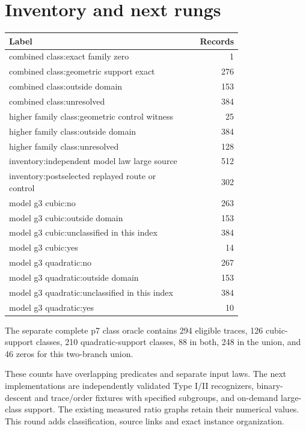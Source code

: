\documentclass[10pt]{article}
\begin{document}
\section{Inventory and next rungs}
\begin{longtable}{p{0.77\linewidth}r}\toprule Label & Records\\\midrule\endhead
combined class:exact family zero & 1\\
combined class:geometric support exact & 276\\
combined class:outside domain & 153\\
combined class:unresolved & 384\\
higher family class:geometric control witness & 25\\
higher family class:outside domain & 384\\
higher family class:unresolved & 128\\
inventory:independent model law large source & 512\\
inventory:postselected replayed route or control & 302\\
model g3 cubic:no & 263\\
model g3 cubic:outside domain & 153\\
model g3 cubic:unclassified in this index & 384\\
model g3 cubic:yes & 14\\
model g3 quadratic:no & 267\\
model g3 quadratic:outside domain & 153\\
model g3 quadratic:unclassified in this index & 384\\
model g3 quadratic:yes & 10\\
\bottomrule\end{longtable}
The separate complete p7 class oracle contains 294 eligible traces, 126 cubic-support classes, 210 quadratic-support classes, 88 in both, 248 in the union, and 46 zeros for this two-branch union.

These counts have overlapping predicates and separate input laws. The next implementations are independently validated Type I/II recognizers, binary-descent and trace/order fixtures with specified subgroups, and on-demand large-class support. The existing measured ratio graphs retain their numerical values. This round adds classification, source links and exact instance organization.
\end{document}
